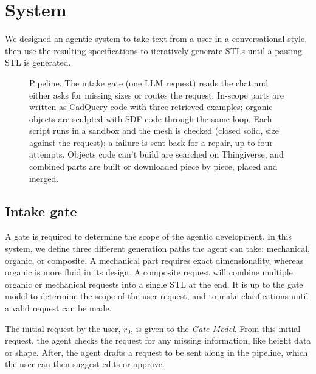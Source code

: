 \section{System}
\label{sec:system}

We designed an agentic system to take text from a user in a conversational style, then use the resulting specifications to iteratively generate STLs until a passing STL is generated.


\begin{figure}[t]
  \centering
  \resizebox{\linewidth}{!}{}
  \caption{Pipeline. The intake gate (one LLM request) reads the chat and either asks for missing sizes or routes
    the request. In-scope parts are written as CadQuery code with three retrieved examples; organic objects are
    sculpted with SDF code through the same loop. Each script runs in a sandbox and the mesh is checked (closed
    solid, size against the request); a failure is sent back for a repair, up to four attempts. Objects code can't
    build are searched on Thingiverse, and combined parts are built or downloaded piece by piece, placed and merged.}
  \label{fig:pipeline}
\end{figure}

\subsection{Intake gate}

A gate is required to determine the scope of the agentic development.
In this system, we define three different generation paths the agent can take: mechanical, organic, or composite.
A mechanical part requires exact dimensionality, whereas organic is more fluid in its design.
A composite request will combine multiple organic or mechanical requests into a single STL at the end.
It is up to the gate model to determine the scope of the user request, and to make clarifications until a valid request can be made.

The initial request by the user, $r_0$, is given to the \textit{Gate Model}.
From this initial request, the agent checks the request for any missing information, like height data or shape.
After, the agent drafts a request to be sent along in the pipeline, which the user can then suggest edits or approve.

